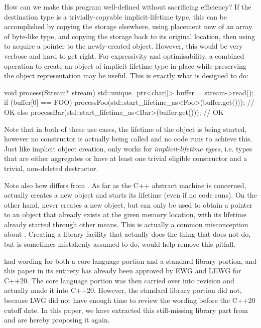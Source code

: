 How can we make this program well-defined without sacrificing efficiency? If the destination type is a trivially-copyable implicit-lifetime type, this can be accomplished by copying the storage elsewhere, using placement new of an array of byte-like type, and copying the storage back to its original location, then using  to acquire a pointer to the newly-created object. However, this would be very verbose and hard to get right. For expressivity and optimisability, a combined operation to create an object of implicit-lifetime type in-place while preserving the object representation may be useful. This is exactly what  is designed to do:

\begin{codeblock}
void process(Stream* stream) {
  std::unique_ptr<char[]> buffer = stream->read();
  if (buffer[0] == FOO)
    processFoo(std::start_lifetime_as<Foo>(buffer.get())); // OK
  else
    processBar(std::start_lifetime_as<Bar>(buffer.get())); // OK
}
\end{codeblock}

Note that in both of these use cases, the lifetime of the object is being started, however no constructor is actually being called and no code runs to achieve this. Just like implicit object creation,  only works for \emph{implicit-lifetime types}, i.e. types that are either aggregates or have at least one trivial eligible constructor and a trivial, non-deleted destructor.

Note also how  differs from . As far as the C++ abstract machine is concerned,  actually creates a new object and starts its lifetime (even if no code runs). On the other hand,  never creates a new object, but can only be used to obtain a pointer to an object that already exists at the given memory location, with its lifetime already started through other means. This is actually a common misconception about . Creating a library facility that actually does the thing that  does not do, but is sometimes mistakenly assumed to do, would help remove this pitfall.

\cite{P0593R5} had wording for both a core language portion and a standard library portion, and this paper in its entirety has already been approved by EWG and LEWG for C++20. The core language portion was then carried over into revision \cite{P0593R6} and actually made it into C++20. However, the standard library portion did not, because LWG did not have enough time to review the wording before the C++20 cutoff date. In this paper, we have extracted this still-missing library part from \cite{P0593R5} and are hereby proposing it again.

